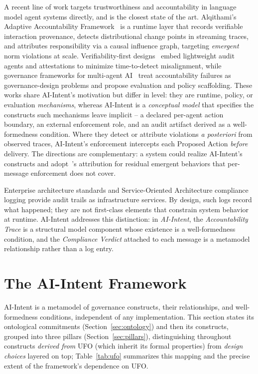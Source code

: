 \documentclass[runningheads]{llncs}
\begin{document}
A recent line of work targets trustworthiness and accountability in
language model agent systems directly, and is the closest state of the
art. Alqithami's Adaptive Accountability Framework~\cite{alqithami2025adaptive}
is a runtime layer that records verifiable interaction provenance,
detects distributional change points in streaming traces, and attributes
responsibility via a causal influence graph, targeting \emph{emergent}
norm violations at scale. Verifiability-first
designs~\cite{gupta2025verifiability} embed lightweight audit agents and
attestations to minimize time-to-detect misalignment, while governance
frameworks for multi-agent AI~\cite{pujari2024ethical,techrxiv2026unified,ieee2025trustworthy}
treat accountability failures as governance-design problems and propose
evaluation and policy scaffolding. These works share AI-Intent's
motivation but differ in level: they are runtime, policy, or evaluation
\emph{mechanisms}, whereas AI-Intent is a \emph{conceptual model} that
specifies the constructs such mechanisms leave implicit -- a declared
per-agent action boundary, an external enforcement role, and an audit
artifact derived as a well-formedness condition. Where they detect or
attribute violations \emph{a posteriori} from observed traces,
AI-Intent's enforcement intercepts each Proposed Action \emph{before}
delivery. The directions are complementary: a system could realize
AI-Intent's constructs and adopt~\cite{alqithami2025adaptive}'s
attribution for residual emergent behaviors that per-message enforcement
does not cover.

Enterprise architecture standards and Service-Oriented Architecture
compliance logging provide audit trails as infrastructure services.
By design, such logs record what happened; they are not first-class
elements that constrain system behavior at runtime. AI-Intent
addresses this distinction: in \textit{AI-Intent}, the \textit{Accountability Trace} is a
structural model component whose existence is a well-formedness
condition, and the \textit{Compliance Verdict} attached to each message is a
metamodel relationship rather than a log entry.

\section{The AI-Intent Framework}
\label{sec:framework}

AI-Intent is a metamodel of governance constructs, their relationships,
and well-formedness conditions, independent of any implementation. This
section states its ontological commitments (Section~\ref{sec:ontology})
and then its constructs, grouped into three pillars
(Section~\ref{sec:pillars}), distinguishing throughout constructs
\emph{derived from} UFO (which inherit its formal properties) from
\emph{design choices} layered on top; Table~\ref{tab:ufo} summarizes this
mapping and the precise extent of the framework's dependence on UFO.
\end{document}
